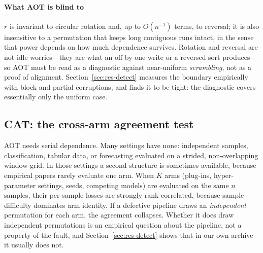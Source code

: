 \documentclass[a4paper,fleqn]{cas-sc}
\newcommand{\fitwidth}[1]{%
  \resizebox{\ifdim\width>\linewidth \linewidth\else \width\fi}{!}{#1}}
\begin{document}
\begin{table}[t]
\centering
\caption{Measured tail behaviour of the normal reference. Each row is one
sequence; \NumTailPerm{} uniform permutations were drawn per sequence and scored
with the normal rule. \emph{Ratio} is the realised false-alarm rate divided by the
nominal level, so $>1$ is anti-conservative. The approximation is optimistic on
long heavy-tailed vectors, whose intact $z$ exceeds $\NumZMinCleanLong{}$, and
conservative on the short stratum, where the intact margin is thin. Generated by
\texttt{tools/make\_artifacts.py aottail}; source
\texttt{artifacts/aot\_tail.csv}.}
\label{tab:tail}
\fitwidth{}
\end{table}

\paragraph{What AOT is blind to}
$r$ is invariant to circular rotation and, up to $O(n^{-1})$ terms, to reversal;
it is also insensitive to a permutation that keeps long contiguous runs intact, in
the sense that power depends on how much dependence survives. Rotation and
reversal are not idle worries---they are what an off-by-one write or a reversed
sort produces---so AOT must be read as a diagnostic against near-uniform
\emph{scrambling}, not as a
proof of alignment. Section~\ref{sec:res-detect} measures the boundary
empirically with block and partial corruptions, and finds it to be tight: the
diagnostic covers essentially only the uniform case.

\subsection{CAT: the cross-arm agreement test}
\label{sec:cat}

AOT needs serial dependence. Many settings have none: independent samples,
classification, tabular data, or forecasting evaluated on a strided,
non-overlapping window grid. In those settings a second structure is
sometimes available, because empirical papers rarely evaluate one arm. When $K$ arms
(plug-ins, hyper-parameter settings, seeds, competing models) are evaluated on the
same $n$ samples, their per-sample losses are strongly rank-correlated, because
sample difficulty dominates arm identity. If a defective pipeline draws an
\emph{independent} permutation for each arm, the agreement collapses. Whether it
does draw independent permutations is an empirical question about the pipeline,
not a property of the fault, and Section~\ref{sec:res-detect} shows that in our
own archive it usually does not.
\end{document}
